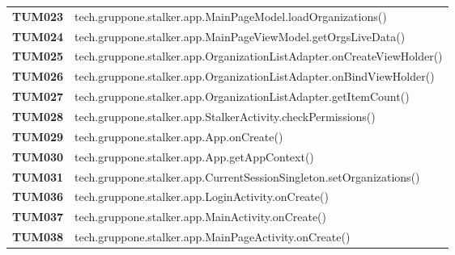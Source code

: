 \documentclass[../../piano-di-qualifica.tex]{subfiles}
\begin{document}
\begin{longtable}[H]{>{\centering\bfseries}m{3cm} >{}m{13cm}}
  TUM023             & tech.gruppone.stalker.app.MainPageModel.loadOrganizations\@()                                           \\

  TUM024             & tech.gruppone.stalker.app.MainPageViewModel.getOrgsLiveData\@()                                         \\

  TUM025             & tech.gruppone.stalker.app.OrganizationListAdapter.onCreateViewHolder\@()                                \\

  TUM026             & tech.gruppone.stalker.app.OrganizationListAdapter.onBindViewHolder\@()                                  \\

  TUM027             & tech.gruppone.stalker.app.OrganizationListAdapter.getItemCount\@()                                      \\

  TUM028             & tech.gruppone.stalker.app.StalkerActivity.checkPermissions\@()                                          \\



  TUM029             & tech.gruppone.stalker.app.App.onCreate\@()                                                              \\

  TUM030             & tech.gruppone.stalker.app.App.getAppContext\@()                                                         \\

  TUM031             & tech.gruppone.stalker.app.CurrentSessionSingleton.setOrganizations\@()                                  \\


  TUM036             & tech.gruppone.stalker.app.LoginActivity.onCreate\@()                                                    \\

  TUM037             & tech.gruppone.stalker.app.MainActivity.onCreate\@()                                                     \\

  TUM038             & tech.gruppone.stalker.app.MainPageActivity.onCreate\@()                                                 \\


\end{longtable}
\end{document}
